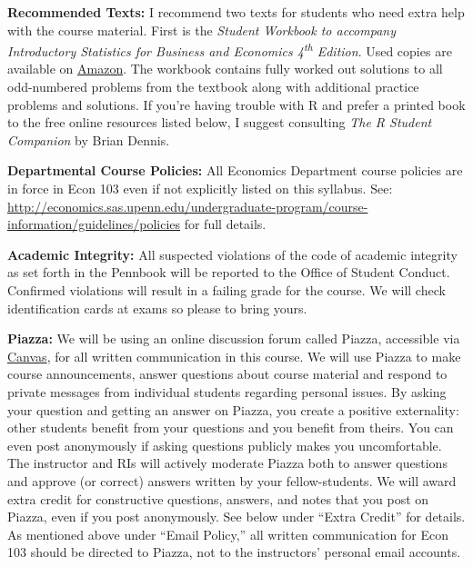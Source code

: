 \documentclass[11pt, letterpaper]{article}
\begin{document}
\medskip

\noindent \textbf{Recommended Texts:} 
I recommend two texts for students who need extra help with the course material. 
First is the \emph{Student Workbook to accompany Introductory Statistics for Business and Economics 4\textsuperscript{th} Edition}. 
Used copies are available on \href{http://www.amazon.com/gp/offer-listing/0471508993/sr=/qid=/ref=olp_page_2?ie=UTF8&colid=&coliid=&condition=all&me=&qid=&shipPromoFilter=0&sort=sip&sr=&startIndex=10}{Amazon}. 
The workbook contains fully worked out solutions to all odd-numbered problems from the textbook along with additional practice problems and solutions.
If you're having trouble with R and prefer a printed book to the free online resources listed below, I suggest consulting \emph{The R Student Companion} by Brian Dennis.


\newpage

\noindent \textbf{Departmental Course Policies: } 
All Economics Department course policies are in force in Econ 103 even if not explicitly listed on this syllabus. 
See: \url{http://economics.sas.upenn.edu/undergraduate-program/course-information/guidelines/policies} for full details. 


\bigskip


\noindent \textbf{Academic Integrity: } 
All suspected violations of the code of academic integrity as set forth in the Pennbook will be reported to the Office of Student Conduct. 
Confirmed violations will result in a failing grade for the course. 
We will check identification cards at exams so please to bring yours.

\medskip

\noindent \textbf{Piazza:} 
We will be using an online discussion forum called Piazza, accessible via \href{http://upenn.instructure.com}{Canvas}, for all written communication in this course.
We will use Piazza to make course announcements, answer questions about course material and respond to private messages from individual students regarding personal issues.
By asking your question and getting an answer on Piazza, you create a positive externality: other students benefit from your questions and you benefit from theirs.
You can even post anonymously if asking questions publicly makes you uncomfortable.
The instructor and RIs will actively moderate Piazza both to answer questions and approve (or correct) answers written by your fellow-students.
We will award extra credit for constructive questions, answers, and notes that you post on Piazza, even if you post anonymously.
See below under ``Extra Credit'' for details.
As mentioned above under ``Email Policy,'' all written communication for Econ 103 should be directed to Piazza, not to the instructors' personal email accounts.
\end{document}
